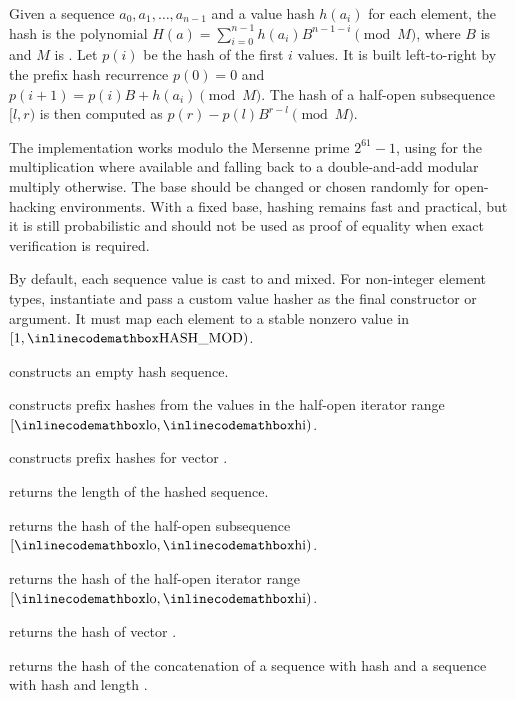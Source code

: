 Given a sequence $a_0, a_1, \ldots, a_{n-1}$ and a value hash $h(a_i)$ for each element, the hash is the polynomial $H(a) = \sum_{i=0}^{n-1} h(a_i) B^{n-1-i} \pmod M$, where $B$ is  and $M$ is . Let $p(i)$ be the hash of the first $i$ values. It is built left-to-right by the prefix hash recurrence $p(0) = 0$ and $p(i + 1) = p(i) B + h(a_i) \pmod M$. The hash of a half-open subsequence $[l, r)$ is then computed as $p(r) - p(l) B^{r-l} \pmod M$.

The implementation works modulo the Mersenne prime $2^{61} - 1$, using  for the multiplication where available and falling back to a double-and-add modular multiply otherwise. The base  should be changed or chosen randomly for open-hacking environments. With a fixed base, hashing remains fast and practical, but it is still probabilistic and should not be used as proof of equality when exact verification is required.

By default, each sequence value is cast to  and mixed. For non-integer element types, instantiate  and pass a custom value hasher as the final constructor or  argument. It must map each element to a stable nonzero value in $[1, {\inlinecodemath{HASH\_MOD}})$.

\begin{compactitem}
  \item {} constructs an empty hash sequence.
  \item {} constructs prefix hashes from the values in the half-open iterator range $[{\inlinecodemath{lo}}, {\inlinecodemath{hi}})$.
  \item {} constructs prefix hashes for vector .
  \item {} returns the length of the hashed sequence.
  \item {} returns the hash of the half-open subsequence $[{\inlinecodemath{lo}}, {\inlinecodemath{hi}})$.
  \item {} returns the hash of the half-open iterator range $[{\inlinecodemath{lo}}, {\inlinecodemath{hi}})$.
  \item {} returns the hash of vector .
  \item {} returns the hash of the concatenation of a sequence with hash  and a sequence with hash  and length .
\end{compactitem}

